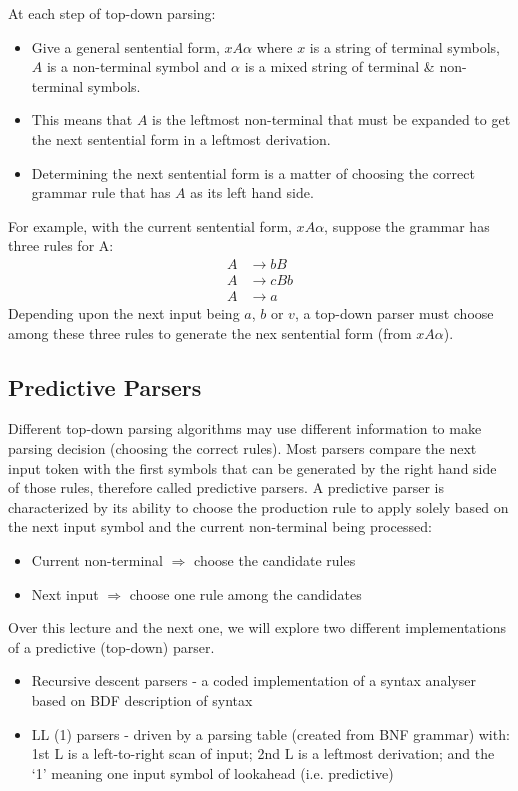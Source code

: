 At each step of top-down parsing:
\begin{itemize}
    \item Give a general sentential form, $xA\alpha$ where $x$ is a string of terminal symbols, $A$ is a non-terminal symbol and $\alpha$ is a mixed string of terminal \& non-terminal symbols. 
    \item This means that $A$ is the leftmost non-terminal that must be expanded to get the next sentential form in a leftmost derivation. 
    \item Determining the next sentential form is a matter of choosing the correct grammar rule that has $A$ as its left hand side. 
\end{itemize}
For example, with the current sentential form, $xA\alpha$, suppose the grammar has three rules for A:
\begin{align*}
    A & \rightarrow bB\\
    A & \rightarrow cBb\\
    A & \rightarrow a
\end{align*}
Depending upon the next input being $a$, $b$ or $v$, a top-down parser must choose among these three rules to generate the nex sentential form (from $xA\alpha$). 

\subsection{Predictive Parsers}
Different top-down parsing algorithms may use different information to make parsing decision (choosing the correct rules). Most parsers compare the next input token with the first symbols that can be generated by the right hand side of those rules, therefore called predictive parsers. A predictive parser is characterized by its ability to choose the production rule to apply solely based on the next input symbol and the current non-terminal being processed:
\begin{itemize}
    \item Current non-terminal $\Rightarrow$ choose the candidate rules
    \item Next input $\Rightarrow$ choose one rule among the candidates
\end{itemize}
Over this lecture and the next one, we will explore two different implementations of a predictive (top-down) parser.
\begin{itemize}
    \item Recursive descent parsers - a coded implementation of a syntax analyser based on BDF description of syntax
    \item LL (1) parsers - driven by a parsing table (created from BNF grammar) with: 1st L is a left-to-right scan of input; 2nd L is a leftmost derivation; and the `1' meaning one input symbol of lookahead (i.e. predictive)
\end{itemize}


